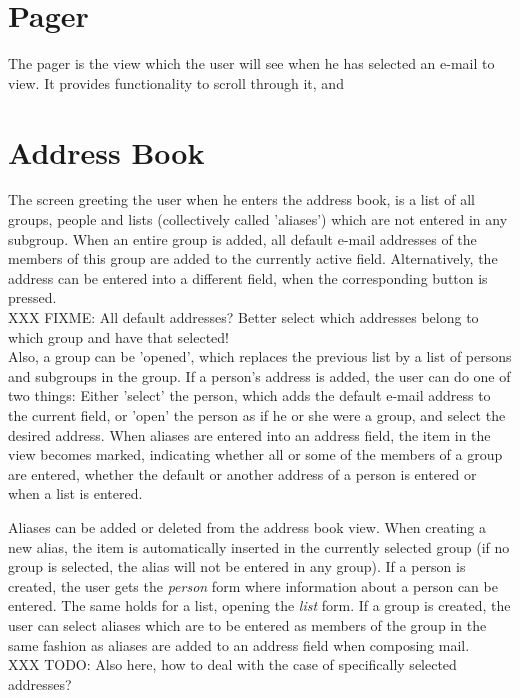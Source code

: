 \documentclass[a4paper]{book}
\begin{document}
\section{Pager}

The pager is the view which the user will see when he has selected an e-mail
to view. It provides functionality to scroll through it, and


\section{Address Book}

The screen greeting the user when he enters the address book, is a list of
all groups, people and lists (collectively called 'aliases') which are not
entered in any subgroup. When an entire group is added, all default e-mail
addresses of the members of this group are added to the currently active
field. Alternatively, the address can be entered into a different field,
when the corresponding button is pressed.
\\XXX FIXME: All default addresses? Better select which addresses belong to
which group and have that selected!\\
Also, a group can be 'opened', which replaces the previous list by a list of
persons and subgroups in the group.
If a person's address is added, the user can do one of two things: Either
'select' the person, which adds the default e-mail address to the current
field, or 'open' the person as if he or she were a group, and select the
desired address. When aliases are entered into an address field, the item in
the view becomes marked, indicating whether all or some of the members of
a group are entered, whether the default or another address of a person
is entered or when a list is entered.

Aliases can be added or deleted from the address book view. When creating
a new alias, the item is automatically inserted in the currently selected
group (if no group is selected, the alias will not be entered in any group).
If a person is created, the user gets the \emph{person} form where
information about a person can be entered. The same holds for a list, opening
the \emph{list} form. If a group is created, the user can select aliases
which are to be entered as members of the group in the same fashion as
aliases are added to an address field when composing mail.
\\XXX TODO: Also here, how to deal with the case of specifically selected
addresses?
\end{document}
